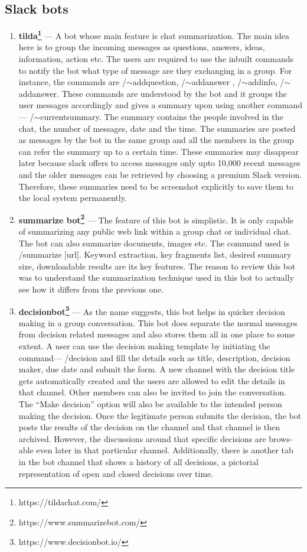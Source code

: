 \subsection{Slack bots}
\label{slackbots}
\begin{enumerate}
\item \textbf{tilda\footnote{https://tildachat.com/}} — A bot whose main feature is chat summarization. The main idea here is to group the incoming messages as questions, answers, ideas, information, action etc. The users are required to use the inbuilt commands to notify the bot what type of message are they exchanging in a group. For instance, the commands are /$\sim$addquestion, /$\sim$addanswer , /$\sim$addinfo, /$\sim$addanswer. These commands are understood by the bot and it groups the user messages accordingly and gives a summary upon using another command —
/$\sim$currentsummary. The summary contains the people involved in the chat, the number of messages, date and the time.
The summaries are posted as messages by the bot in the same group and all the members in the group can refer the summary up to a certain time. These summaries may disappear later because slack offers to access messages only upto 10,000 recent messages and the older messages can be retrieved by choosing a premium Slack version. Therefore, these summaries need to be screenshot explicitly to save them to the local system permanently.

\item  \textbf{summarize bot\footnote{https://www.summarizebot.com/}} —
The feature of this bot is simplistic. It is only capable of summarizing any public web link within a group chat or individual chat. The bot can also summarize documents, images etc. The command used is /summarize [url]. Keyword extraction, key fragments list, desired summary size, downloadable results are its key features. The reason to review this bot was to understand the summarization technique used in this bot to actually see how it differs from the previous one.

\item  \textbf{decisionbot\footnote{https://www.decisionbot.io/}} —
As the name suggests, this bot helps in quicker decision making in a group conversation. This bot does separate the normal messages from decision related messages and also stores them all in one place to some extent. A user can use the decision making template by initiating the command— /decision and fill the details such as title, description, decision maker, due date and submit the form. A new channel with the decision title gets automatically created and the users are allowed to edit the details in that channel. Other members can also be invited to join the conversation. The ``Make decision” option will also be available to the intended person making the decision. Once the legitimate person submits the decision, the bot posts the results of the decision on the channel and that channel is then archived. However, the discussions around that specific decisions are brows-able even later in that particular channel. Additionally, there is another tab in the bot channel that shows a history of all decisions, a pictorial representation of open and closed decisions over time.


\end{enumerate}
